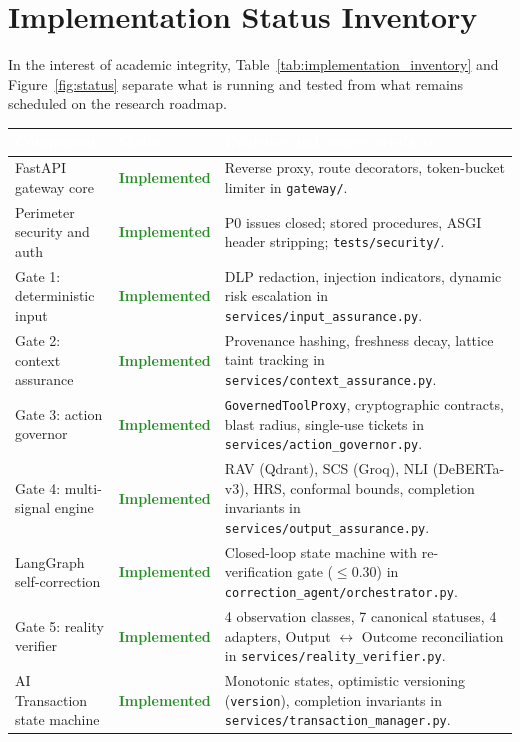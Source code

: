 \documentclass[11pt,a4paper]{article}
\newcommand{\hc}[1]{\textcolor{white}{\textbf{#1}}}
\newcommand{\hdrrow}{\rowcolor{primarynavy}}
\newcommand{\stImpl}{\textcolor{forestgreen}{\textbf{Implemented}}}
\newcommand{\fp}[1]{\texttt{\scriptsize #1}}
\begin{document}
\section{Implementation Status Inventory}
In the interest of academic integrity, Table~\ref{tab:implementation_inventory} and Figure~\ref{fig:status} separate what is running and tested from what remains scheduled on the research roadmap.

\begin{table}[!htbp]
\centering\small
\renewcommand{\arraystretch}{1.2}
\begin{tabularx}{\linewidth}{@{}L{3.4cm} L{1.8cm} Y@{}}
\hdrrow \hc{Component} & \hc{Status} & \hc{Evidence and source artefacts}\\
\toprule
FastAPI gateway core & \stImpl & Reverse proxy, route decorators, token-bucket limiter in \fp{gateway/}.\\
Perimeter security and auth & \stImpl & P0 issues closed; stored procedures, ASGI header stripping; \fp{tests/security/}.\\
Gate 1: deterministic input & \stImpl & DLP redaction, injection indicators, dynamic risk escalation in \fp{services/input\_assurance.py}.\\
Gate 2: context assurance & \stImpl & Provenance hashing, freshness decay, lattice taint tracking in \fp{services/context\_assurance.py}.\\
Gate 3: action governor & \stImpl & \fp{GovernedToolProxy}, cryptographic contracts, blast radius, single-use tickets in \fp{services/action\_governor.py}.\\
Gate 4: multi-signal engine & \stImpl & RAV (Qdrant), SCS (Groq), NLI (DeBERTa-v3), HRS, conformal bounds, completion invariants in \fp{services/output\_assurance.py}.\\
LangGraph self-correction & \stImpl & Closed-loop state machine with re-verification gate ($\le0.30$) in \fp{correction\_agent/orchestrator.py}.\\
Gate 5: reality verifier & \stImpl & 4 observation classes, 7 canonical statuses, 4 adapters, Output $\leftrightarrow$ Outcome reconciliation in \fp{services/reality\_verifier.py}.\\
AI Transaction state machine & \stImpl & Monotonic states, optimistic versioning (\texttt{version}), completion invariants in \fp{services/transaction\_manager.py}.\\

\end{tabularx}
\end{table}
\end{document}
